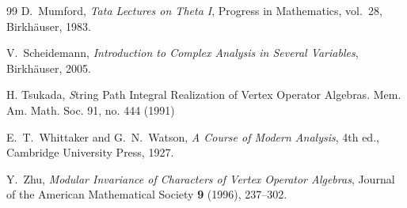 \documentclass[11pt,a4paper]{amsart}
\numberwithin{equation}{section}
\theoremstyle{definition}
\theoremstyle{remark}
\begin{document}
\begin{thebibliography}{99}
D.~Mumford,
\emph{Tata Lectures on Theta I},
Progress in Mathematics, vol.~28, Birkh\"auser, 1983.

V.~Scheidemann,
\emph{Introduction to Complex Analysis in Several Variables},
Birkh\"auser, 2005.

 H. Tsukada, {\emph String Path Integral Realization of Vertex Operator Algebras}. Mem. Am. Math. Soc. 91, no.
 444 (1991)



E.~T.~Whittaker and G.~N.~Watson,
\emph{A Course of Modern Analysis}, 4th ed.,
Cambridge University Press, 1927.





Y.~Zhu,
\emph{Modular Invariance of Characters of Vertex Operator Algebras},
Journal of the American Mathematical Society \textbf{9} (1996), 237--302.

\end{thebibliography}
\end{document}
